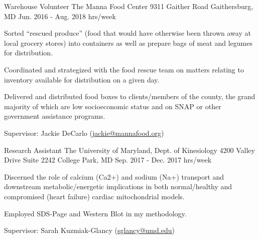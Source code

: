 \begin{cventries}
  \cventry
    {Warehouse Volunteer } %
    {The Manna Food Center } %
    {9311 Gaither Road \newline
Gaithersburg, MD} %
    {Jun. 2016 - Aug. 2018  hrs/week} %
    {
      \begin{cvitems} %
        \item{Sorted “rescued produce” (food that would have otherwise been thrown away at local grocery stores) into containers as well as prepare bags of meat and legumes for distribution.}
        \item{Coordinated and strategized with the food rescue team on matters relating to inventory available for distribution on a given day.}
        \item{Delivered and distributed food boxes to clients/members of the county, the grand majority of which are low socioeconomic status and on SNAP or other government assistance programs.}
        \item {Supervisor: Jackie DeCarlo (\textcolor{navyblue}{\underline{\href{mailto:jackie@mannafood.org}{jackie@mannafood.org}}})}
      \end{cvitems}
    }



  \cventry
    {Research Assistant} %
    {The University of Maryland, Dept. of Kinesiology} %
    {4200 Valley Drive \newline Suite 2242 \newline College Park, MD} %
    {Sep. 2017 - Dec. 2017  hrs/week} %
    {
      \begin{cvitems} %
        \item {Discerned the role of calcium (Ca2+) and sodium (Na+) transport and downstream metabolic/energetic implications in both normal/healthy and compromised (heart failure) cardiac mitochondrial models.}
        \item{Employed SDS-Page and Western Blot in my methodology.}
        \item{Supervisor: Sarah Kuzmiak-Glancy (\textcolor{navyblue}{
        {\underline{\href{mailto:sglancy@umd.edu}{sglancy@umd.edu}}}})}
      \end{cvitems}
    }


\end{cventries}
